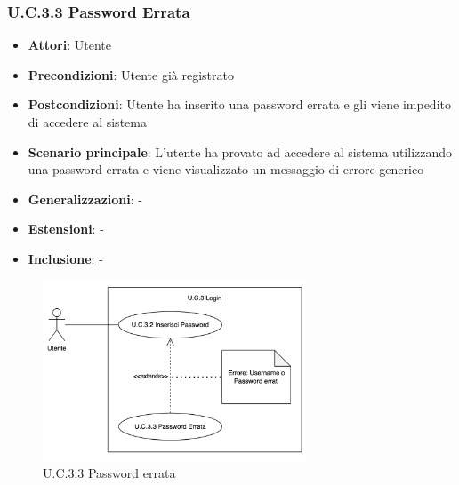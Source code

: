 \subsubsection{U.C.3.3 Password Errata}
\begin{itemize}
    \item \textbf{Attori}: Utente
    \item \textbf{Precondizioni}: Utente già registrato
    \item \textbf{Postcondizioni}: Utente ha inserito una password errata e gli viene impedito di accedere al sistema
    \item \textbf{Scenario principale}: L'utente ha provato ad accedere al sistema utilizzando una password errata e viene visualizzato un messaggio di errore generico
    \item \textbf{Generalizzazioni}: -
    \item \textbf{Estensioni}: -
    \item \textbf{Inclusione}: -
\end{itemize}
\begin{figure}[h!]
    \centering
    \includegraphics[width=0.7\textwidth]{img/UC3-3.png}
    \caption{U.C.3.3 Password errata}
\end{figure}
